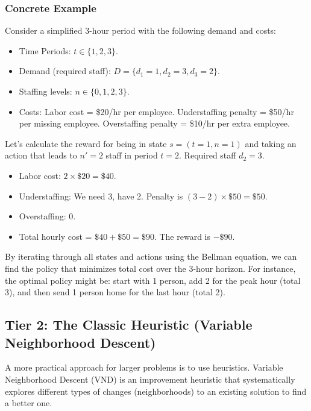 \documentclass{article}
\begin{document}
\subsubsection{Concrete Example}
Consider a simplified 3-hour period with the following demand and costs:
\begin{itemize}
    \item Time Periods: $t \in \{1, 2, 3\}$.
    \item Demand (required staff): $D = \{d_1=1, d_2=3, d_3=2\}$.
    \item Staffing levels: $n \in \{0, 1, 2, 3\}$.
    \item Costs: Labor cost = \$20/hr per employee. Understaffing penalty = \$50/hr per missing employee. Overstaffing penalty = \$10/hr per extra employee.
\end{itemize}
Let's calculate the reward for being in state $s=(t=1, n=1)$ and taking an action that leads to $n'=2$ staff in period $t=2$. Required staff $d_2=3$.
\begin{itemize}
    \item Labor cost: $2 \times \$20 = \$40$.
    \item Understaffing: We need 3, have 2. Penalty is $(3-2) \times \$50 = \$50$.
    \item Overstaffing: 0.
    \item Total hourly cost = $\$40 + \$50 = \$90$. The reward is $-\$90$.
\end{itemize}
By iterating through all states and actions using the Bellman equation, we can find the policy that minimizes total cost over the 3-hour horizon. For instance, the optimal policy might be: start with 1 person, add 2 for the peak hour (total 3), and then send 1 person home for the last hour (total 2).

\subsection{Tier 2: The Classic Heuristic (Variable Neighborhood Descent)}
A more practical approach for larger problems is to use heuristics. Variable Neighborhood Descent (VND) is an improvement heuristic that systematically explores different types of changes (neighborhoods) to an existing solution to find a better one.
\end{document}
